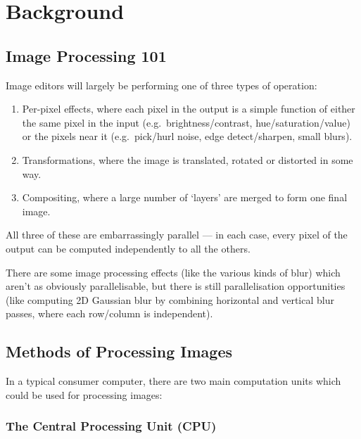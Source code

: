\documentclass[12pt]{article}
\begin{document}
\pagebreak

\tableofcontents



\pagebreak

\section{Background}

\subsection{Image Processing 101}

Image editors will largely be performing one of three types of operation:

\begin{enumerate}
    \item Per-pixel effects, where each pixel in the output is a simple function of either the same
        pixel in the input (e.g.\ brightness/contrast, hue/saturation/value) or the pixels near it
        (e.g.\ pick/hurl noise, edge detect/sharpen, small blurs).
    \item Transformations, where the image is translated, rotated or distorted in some way.
    \item Compositing, where a large number of `layers' are merged to form one final image.
\end{enumerate}

All three of these are embarrassingly parallel --- in each case, every pixel of the output can be
computed independently to all the others.

There are some image processing effects (like the various kinds of blur) which aren't as obviously
parallelisable, but there is still parallelisation opportunities (like computing 2D Gaussian blur by
combining horizontal and vertical blur passes, where each row/column is independent).



\subsection{Methods of Processing Images}

In a typical consumer computer, there are two main computation units which could be used for
processing images:

\subsubsection{The Central Processing Unit (CPU)}
\end{document}
